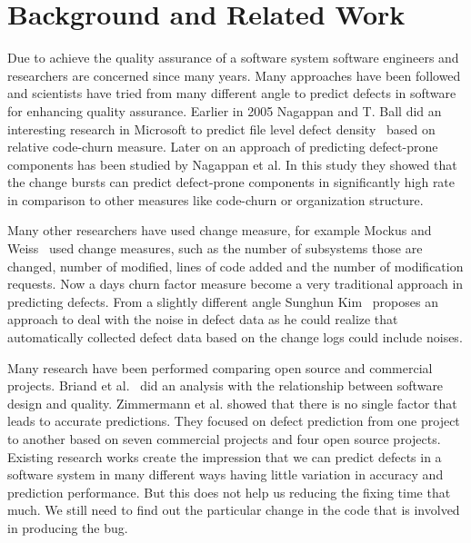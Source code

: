 \documentclass[10pt, conference]{IEEEtran}
\begin{document}
\section{Background and Related Work}
\label{sec:backgr-relat-work}

Due to achieve the quality assurance of a software system software engineers and researchers are concerned since many years. Many approaches have been followed and scientists have tried from many different angle to predict defects in software for enhancing quality assurance. Earlier in 2005 Nagappan and T. Ball did an interesting research in Microsoft to predict file level defect density~\cite{Nagappan2005ICSE} based on relative code-churn measure. Later on an approach of predicting defect-prone components has been studied by Nagappan et al. In this study they showed that the change bursts can predict defect-prone components in significantly high rate in comparison to other measures like code-churn or organization structure.

Many other researchers have used change measure, for example Mockus and Weiss~\cite{Mockus2000Bell} used change measures, such as the number of subsystems those are changed, number of modified, lines of code added and the number of modification requests. Now a days churn factor measure become a very traditional approach in predicting defects. From a slightly different angle Sunghun Kim~\cite{Kim2011ICSE} proposes an approach to deal with the noise in defect data as he could realize that automatically collected defect data based on the change logs could include noises.

Many research have been performed comparing open source and commercial projects. Briand et al.~\cite{Briand1999ICSE} did an analysis with the relationship between software design and quality. Zimmermann et al.\cite{Zimmermann2009ESECS} showed that there is no single factor that leads to accurate predictions. They focused on defect prediction from one project to another based on seven commercial projects and four open source projects. Existing research works create the impression that we can predict defects in a software system in many different ways having little variation in accuracy and prediction performance. But this does not help us reducing the fixing time that much. We still need to find out the particular change in the code that is involved in producing the bug.
\end{document}
